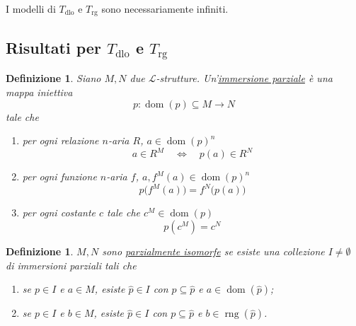 \documentclass[10pt]{article}
\newcommand{\1}{\mathds{1}}
\theoremstyle{definition}%
\theoremstyle{plain}
\newtheorem{definizione}[thm]{Definizione}
\theoremstyle{remark}
\newcommand{\Tdlo}{T_{\text{dlo}}}
\newcommand{\Trg}{T_{\text{rg}}}
\begin{document}
I modelli di \(\Tdlo\) e \(\Trg\) sono necessariamente infiniti.
\subsection{Risultati per \(\Tdlo\) e \(\Trg\)}
\label{sec:org0147f01}

\begin{definizione}
Siano \(M,N\) due \(\mathcal{L}\)-strutture. Un'\uline{immersione parziale} è una mappa iniettiva
\begin{equation*}
p:\operatorname{dom}(p) \subseteq M\to N
\end{equation*}
tale che
\begin{enumerate}
\item per ogni relazione \(n\)-aria \(R\), \(a \in \operatorname{dom}(p)^{n}\)
\begin{equation*}
 a \in R^{M}\quad\iff\quad p(a) \in R^{N}
\end{equation*}
\item per ogni funzione \(n\)-aria \(f\), \(a, f^{M}(a) \in \operatorname{dom}(p)^{n}\)
\begin{equation*}
 p\big(f^{M}(a)\big)=f^{N}\big(p(a)\big)
\end{equation*}
\item per ogni costante \(c\) tale che \(c^{M} \in \operatorname{dom}(p)\)
\begin{equation*}
 p(c^{M})=c^{N}
\end{equation*}
\end{enumerate}
\end{definizione}

\begin{definizione}
\(M,N\) sono \uline{parzialmente isomorfe} se esiste una collezione \(I\neq\emptyset\) di immersioni parziali tali che
\begin{enumerate}
\item se \(p \in I\) e \(a \in M\), esiste \(\hat{p} \in I\) con \(p \subseteq \hat{p}\) e \(a \in \operatorname{dom}(\hat{p})\);
\item se \(p \in I\) e \(b \in M\), esiste \(\hat{p} \in I\) con \(p \subseteq \hat{p}\) e \(b \in \operatorname{rng}(\hat{p})\).
\end{enumerate}
\end{definizione}
\end{document}
